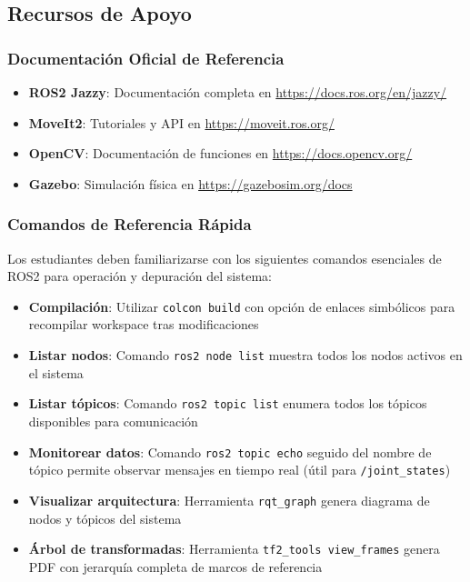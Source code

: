 \subsection{Recursos de Apoyo}

\subsubsection{Documentación Oficial de Referencia}

\begin{itemize}
    \item \textbf{ROS2 Jazzy}: Documentación completa en \url{https://docs.ros.org/en/jazzy/}
    \item \textbf{MoveIt2}: Tutoriales y API en \url{https://moveit.ros.org/}
    \item \textbf{OpenCV}: Documentación de funciones en \url{https://docs.opencv.org/}
    \item \textbf{Gazebo}: Simulación física en \url{https://gazebosim.org/docs}
\end{itemize}

\subsubsection{Comandos de Referencia Rápida}

Los estudiantes deben familiarizarse con los siguientes comandos esenciales de ROS2 para operación y depuración del sistema:

\begin{itemize}
    \item \textbf{Compilación}: Utilizar \texttt{colcon build} con opción de enlaces simbólicos para recompilar workspace tras modificaciones
    \item \textbf{Listar nodos}: Comando \texttt{ros2 node list} muestra todos los nodos activos en el sistema
    \item \textbf{Listar tópicos}: Comando \texttt{ros2 topic list} enumera todos los tópicos disponibles para comunicación
    \item \textbf{Monitorear datos}: Comando \texttt{ros2 topic echo} seguido del nombre de tópico permite observar mensajes en tiempo real (útil para \texttt{/joint\_states})
    \item \textbf{Visualizar arquitectura}: Herramienta \texttt{rqt\_graph} genera diagrama de nodos y tópicos del sistema
    \item \textbf{Árbol de transformadas}: Herramienta \texttt{tf2\_tools view\_frames} genera PDF con jerarquía completa de marcos de referencia
\end{itemize}

